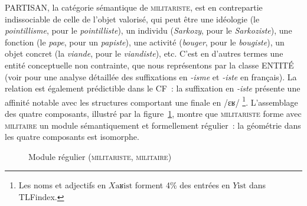 \documentclass[output=paper]{langsci/langscibook}
\begin{document}
{PARTISAN}, la catégorie sémantique de \textsc{militariste}, est en contrepartie indissociable de celle de l'objet valorisé, qui peut être une idéologie (le \emph{pointillisme}, pour le \emph{pointilliste}), un individu (\emph{Sarkozy}, pour le \emph{Sarkoziste}), une fonction (le \emph{pape}, pour un \emph{papiste}), une activité (\emph{bouger}, pour le \emph{bougiste}), un objet concret (la \emph{viande}, pour le \emph{viandiste}), etc.  C'est en d'autres termes une entité conceptuelle non contrainte, que nous représentons par la classe {ENTITÉ} (voir \cite{roche2007.isme-decembrettes,roche2011.isme-dumal} pour une analyse détaillée des suffixations en \emph{\mbox{-isme}} et \emph{\mbox{-iste}} en français). La relation est également prédictible dans le CF~: la suffixation en \emph{\mbox{-iste}} présente une affinité notable avec les structures comportant une finale en /ɛʁ/%
\footnote{%
  Les noms et adjectifs en $X\textrm{aʁist}$ 
 forment 4\% des entrées en $Y\textrm{ist}$
 dans TLFindex.%
}. L'assemblage des quatre composants, illustré par la figure~\ref{fig:antimilitariste3}, montre que \textsc{militariste} forme avec \textsc{militaire} un module  sémantiquement et formellement régulier~: la géométrie dans les quatre composants est isomorphe.

\begin{figure}
  \centering
  \caption{Module régulier (\textsc{militariste}, \textsc{militaire})}
  \label{fig:antimilitariste3}
\end{figure}
\end{document}
